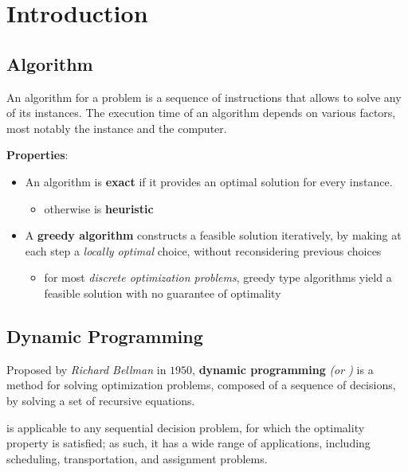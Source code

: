 \documentclass[english]{article}
\begin{document}


\section{Introduction}

\subsection{Algorithm}

An algorithm for a problem is a sequence of instructions that allows to solve any of its instances.
The execution time of an algorithm depends on various factors, most notably the instance and the computer.

\bigskip
\textbf{Properties}:

\begin{itemize}
  \item An algorithm is \textbf{exact} if it provides an optimal solution for every instance.
        \begin{itemize}
          \item otherwise is \textbf{heuristic}
        \end{itemize}
  \item A \textbf{greedy algorithm} constructs a feasible solution iteratively, by making at each step a \textit{locally optimal} choice, without reconsidering previous choices
        \begin{itemize}
          \item for most \textit{discrete optimization problems}, greedy type algorithms yield a feasible solution with no guarantee of optimality
        \end{itemize}
\end{itemize}

\subsection{Dynamic Programming}

Proposed by \textit{Richard Bellman} in \(1950\), \textbf{dynamic programming} \textit{(or \DP)} is a method for solving optimization problems, composed of a sequence of decisions, by solving a set of recursive equations.

\DP is applicable to any sequential decision problem, for which the optimality property is satisfied;
as such, it has a wide range of applications, including scheduling, transportation, and assignment problems.
\end{document}
